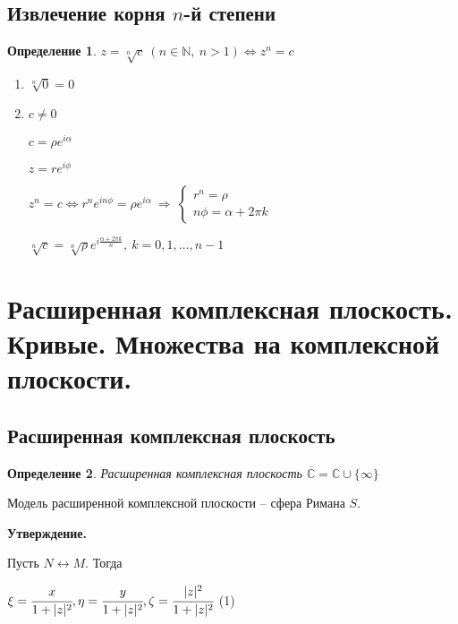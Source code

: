 \documentclass[draft]{report}
\newcommand{\then}{\ \Rightarrow\ }
\renewcommand{\C}{\mathbb{C}}
\newcommand{\N}{\mathbb{N}}
\newcommand{\LRA}{\Leftrightarrow}
\renewcommand{\bar}{\overline}
\newcommand{\opr}[1]{\begin{opred}#1\end{opred}}
\newtheorem*{opred}{Определение}
\theoremstyle{remark}
\begin{document}
\subsection{Извлечение корня $n$-й степени}

\opr{$z=\sqrt[n]{c}\ (n\in\N,\ n>1)\LRA z^n=c$}
\begin{enumerate}
\item$\sqrt[n]{0}=0$
\item$c\neq0$

$c=\rho e^{i\alpha}$

$z=re^{i\phi}$

$z^n=c\LRA r^ne^{in\phi}=\rho e^{i\alpha}\then\left\{\begin{matrix}
r^n=\rho \\
n\phi=\alpha+2\pi k
\end{matrix}\right.$

$\sqrt[n]{c}=\sqrt[n]{\rho}e^{i\frac{\alpha+2\pi k}{n}},\ k=0,1,\ldots,n-1$
\end{enumerate}

\section{Расширенная комплексная плоскость. Кривые. Множества на комплексной плоскости.}

\subsection{Расширенная комплексная плоскость}

\begin{opred}
Расширенная комплексная плоскость $\bar{\C}=\C\cup\{\infty\}$
\end{opred}
Модель расширенной комплексной плоскости -- сфера Римана $S$.

{\bfseries Утверждение.}

Пусть $N\leftrightarrow M$. Тогда

$\xi=\cfrac{x}{1+|z|^2}, \eta=\cfrac{y}{1+|z|^2}, \zeta=\cfrac{|z|^2}{1+|z|^2}$ (1)
\end{document}

